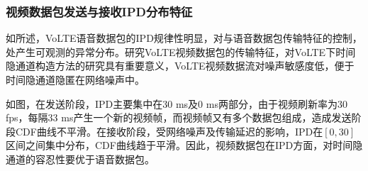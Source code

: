 
\subsubsection{视频数据包发送与接收IPD分布特征}
\label{chap:backinfo:volte:packets:ipd}
如所述，VoLTE语音数据包的IPD规律性明显，对与语音数据包传输特征的控制，处产生可观测的异常分布。研究VoLTE视频数据包的传输特征，对VoLTE下时间隐通道构造方法的研究具有重要意义，VoLTE视频数据流对噪声敏感度低，便于时间隐通道隐匿在网络噪声中。

如图，在发送阶段，IPD主要集中在30 ms及0 ms两部分，由于视频刷新率为30 fps，每隔33 ms产生一个新的视频帧，而视频帧又有多个数据包组成，造成发送阶段CDF曲线不平滑。在接收阶段，受网络噪声及传输延迟的影响，IPD在$[0, 30]$区间之间集中分布，CDF曲线趋于平滑。因此，视频数据包在IPD方面，对时间隐通道的容忍性要优于语音数据包。


